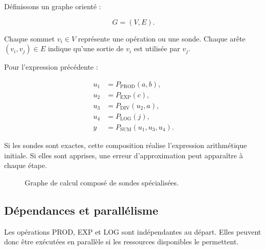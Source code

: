 \documentclass[11pt,a4paper]{article}
\begin{document}
Définissons un graphe orienté :

\[
G=(V,E).
\]

Chaque sommet $v_i\in V$ représente une opération ou une sonde.
Chaque arête $(v_i,v_j)\in E$ indique qu'une sortie de $v_i$ est
utilisée par $v_j$.

Pour l'expression précédente :

\[
\begin{aligned}
u_1 &= P_{\mathrm{PROD}}(a,b),\\
u_2 &= P_{\mathrm{EXP}}(c),\\
u_3 &= P_{\mathrm{DIV}}(u_2,a),\\
u_4 &= P_{\mathrm{LOG}}(j),\\
y &= P_{\mathrm{SUM}}(u_1,u_3,u_4).
\end{aligned}
\]

Si les sondes sont exactes, cette composition réalise l'expression
arithmétique initiale. Si elles sont apprises, une erreur
d'approximation peut apparaître à chaque étape.

\begin{figure}[H]
\centering
{}
\caption{Graphe de calcul composé de sondes spécialisées.}
\end{figure}

\subsection{Dépendances et parallélisme}

Les opérations PROD, EXP et LOG sont indépendantes au départ.
Elles peuvent donc être exécutées en parallèle si les ressources
disponibles le permettent.
\end{document}
